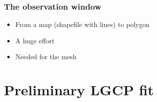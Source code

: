 \documentclass[t]{beamer}
\begin{document}
\begin{frame}
	\frametitle{The observation window}
	\vskip -15pt
	\begin{itemize}
  \item From a map (shapefile with lines) to polygon 
  \item A huge effort
  \item Needed for the mesh 
\end{itemize}
\end{frame}


\section{Preliminary LGCP fit}
\end{document}
